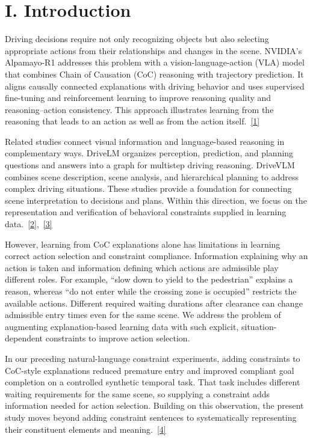 \documentclass[11pt,a4paper]{article}
\begin{document}
\section*{I. Introduction}
Driving decisions require not only recognizing objects but also selecting appropriate actions from their relationships and changes in the scene. NVIDIA's Alpamayo-R1 addresses this problem with a vision-language-action (VLA) model that combines Chain of Causation (CoC) reasoning with trajectory prediction. It aligns causally connected explanations with driving behavior and uses supervised fine-tuning and reinforcement learning to improve reasoning quality and reasoning–action consistency. This approach illustrates learning from the reasoning that leads to an action as well as from the action itself.~\href{\detokenize{https://arxiv.org/abs/2511.00088}}{[1]}\par\vspace{5pt}
Related studies connect visual information and language-based reasoning in complementary ways. DriveLM organizes perception, prediction, and planning questions and answers into a graph for multistep driving reasoning. DriveVLM combines scene description, scene analysis, and hierarchical planning to address complex driving situations. These studies provide a foundation for connecting scene interpretation to decisions and plans. Within this direction, we focus on the representation and verification of behavioral constraints supplied in learning data.~\href{\detokenize{https://arxiv.org/abs/2312.14150}}{[2]},~\href{\detokenize{https://arxiv.org/abs/2402.12289}}{[3]}\par\vspace{5pt}
However, learning from CoC explanations alone has limitations in learning correct action selection and constraint compliance. Information explaining why an action is taken and information defining which actions are admissible play different roles. For example, “slow down to yield to the pedestrian” explains a reason, whereas “do not enter while the crossing zone is occupied” restricts the available actions. Different required waiting durations after clearance can change admissible entry times even for the same scene. We address the problem of augmenting explanation-based learning data with such explicit, situation-dependent constraints to improve action selection.\par\vspace{5pt}
In our preceding natural-language constraint experiments, adding constraints to CoC-style explanations reduced premature entry and improved compliant goal completion on a controlled synthetic temporal task. That task includes different waiting requirements for the same scene, so supplying a constraint adds information needed for action selection. Building on this observation, the present study moves beyond adding constraint sentences to systematically representing their constituent elements and meaning.~\href{\detokenize{../../../../../../projects/01-safety-constrained-coc/docs/reports/TEMPORAL_GUARD_MULTISEED_EXPERIMENT_REPORT_V01.md}}{[4]}\par\vspace{5pt}
\end{document}
